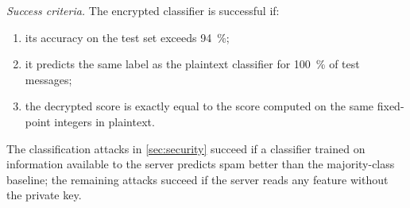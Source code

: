 \textit{Success criteria.}
The encrypted classifier is successful if:
\begin{enumerate}
  \item its accuracy on the test set exceeds \SI{94}{\percent};
  \item it predicts the same label as the plaintext classifier for \SI{100}{\percent} of test messages;
  \item the decrypted score is exactly equal to the score computed on the same fixed-point integers in plaintext.
\end{enumerate}
The classification attacks in \cref{sec:security} succeed if a classifier trained on information available to the server predicts spam better than the majority-class baseline; the remaining attacks succeed if the server reads any feature without the private key.
